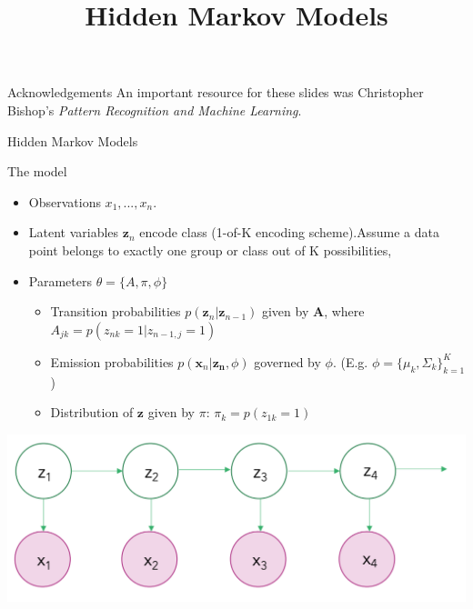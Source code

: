 \documentclass[10pt]{beamer}
\title{Hidden Markov Models}
\begin{document}
\maketitle


\begin{frame}{Acknowledgements}
An important resource for these slides was Christopher Bishop's \textit{Pattern Recognition and Machine Learning}.
\end{frame}

\begin{frame}{Hidden Markov Models}
\begin{sblock}{The model}
\begin{minipage}{0.6\textwidth}
\begin{itemize}
\item Observations $x_1, ..., x_n$.
\item  Latent variables $\mathbf{z}_n$ encode class (1-of-K encoding scheme).Assume a data point belongs to exactly one group or class out of K possibilities,
\item  Parameters $\theta = \{ A, \pi, \phi\}$
\begin{itemize} 
\item Transition probabilities $p(\mathbf{z}_n | \mathbf{z}_{n-1})$ given by $\mathbf{A}$, where $A_{jk} = p(z_{nk} = 1 | z_{n-1, j}= 1 )$
\item Emission probabilities $p(\mathbf{x}_n | \mathbf{z_n}, \phi)$ governed by $\phi$. (E.g. $\phi = \{\mu_k, \Sigma_k\}_{k=1}^K$)
\item Distribution of $\mathbf{z}$ given by $\pi$: $\pi_k = p(z_{1k}=1)$
\end{itemize}
\end{itemize}
\end{minipage} 
\hfill
\begin{minipage}{0.3\textwidth}
\includegraphics[width=\textwidth]{images/hmm}
\end{minipage} 

\end{sblock}
\end{frame}
\end{document}
